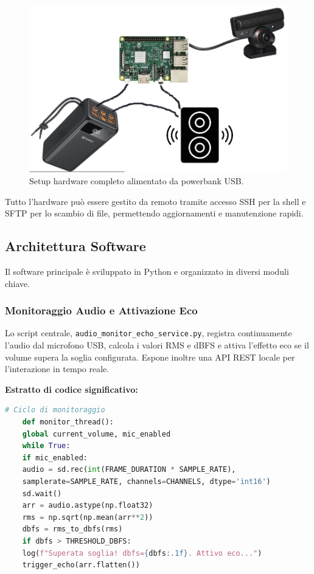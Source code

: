 \documentclass[fleqn,10pt]{SelfArx} %
\begin{document}
 \begin{figure}[ht]
	     \centering
	     \includegraphics[width=0.7\linewidth]{schema.png}
	     \caption{Setup hardware completo alimentato da powerbank USB.}
	     \label{fig:hardware}
	 \end{figure}

Tutto l’hardware può essere gestito da remoto tramite accesso SSH per la shell e SFTP per lo scambio di file, permettendo aggiornamenti e manutenzione rapidi.


\subsection{Architettura Software}
\label{sec:software}

Il software principale è sviluppato in Python e organizzato in diversi moduli chiave.

\subsubsection{Monitoraggio Audio e Attivazione Eco}

Lo script centrale, \texttt{audio\_monitor\_echo\_service.py}, registra continuamente l’audio dal microfono USB, calcola i valori RMS e dBFS e attiva l’effetto eco se il volume supera la soglia configurata.  
Espone inoltre una API REST locale per l’interazione in tempo reale.

\textbf{Estratto di codice significativo:}
\begin{lstlisting}[language=Python]
	# Ciclo di monitoraggio
	def monitor_thread():
	global current_volume, mic_enabled
	while True:
	if mic_enabled:
	audio = sd.rec(int(FRAME_DURATION * SAMPLE_RATE),
	samplerate=SAMPLE_RATE, channels=CHANNELS, dtype='int16')
	sd.wait()
	arr = audio.astype(np.float32)
	rms = np.sqrt(np.mean(arr**2))
	dbfs = rms_to_dbfs(rms)
	if dbfs > THRESHOLD_DBFS:
	log(f"Superata soglia! dbfs={dbfs:.1f}. Attivo eco...")
	trigger_echo(arr.flatten())
\end{lstlisting}
\end{document}

